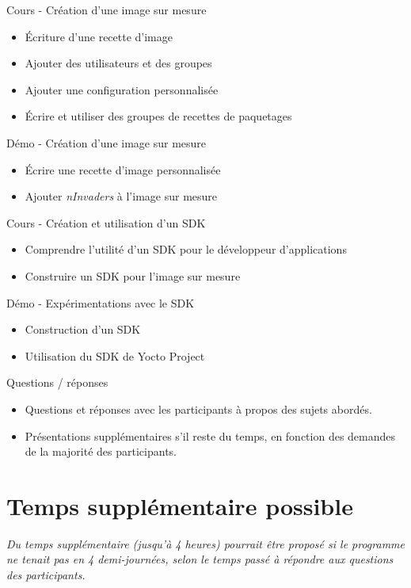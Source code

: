 \documentclass[a4paper,12pt,obeyspaces,spaces,hyphens]{article}
\begin{document}
\feagendatwocolumn
{Cours - Création d'une image sur mesure}
{
  \begin{itemize}
  \item Écriture d'une recette d'image
  \item Ajouter des utilisateurs et des groupes
  \item Ajouter une configuration personnalisée
  \item Écrire et utiliser des groupes de recettes de paquetages
  \end{itemize}
}
{Démo - Création d'une image sur mesure}
{
  \begin{itemize}
  \item Écrire une recette d'image personnalisée
  \item Ajouter {\em nInvaders} à l'image sur mesure
  \end{itemize}
}
\feagendatwocolumn
{Cours - Création et utilisation d'un SDK}
{
  \begin{itemize}
  \item Comprendre l'utilité d'un SDK pour le développeur d'applications
  \item Construire un SDK pour l'image sur mesure
  \end{itemize}
}
{Démo - Expérimentations avec le SDK}
{
  \begin{itemize}
  \item Construction d'un SDK
  \item Utilisation du SDK de Yocto Project
  \end{itemize}
}

\feagendaonecolumn
{Questions / réponses}
{
  \begin{itemize}
  \item Questions et réponses avec les participants à propos des sujets abordés.
  \item Présentations supplémentaires s'il reste du temps, en fonction des demandes
        de la majorité des participants.
  \end{itemize}
}

\section{Temps supplémentaire possible}

{\em Du temps supplémentaire (jusqu'à 4 heures) pourrait être proposé si le programme ne tenait
     pas en 4 demi-journées, selon le temps passé à répondre aux questions des participants.}
\end{document}
